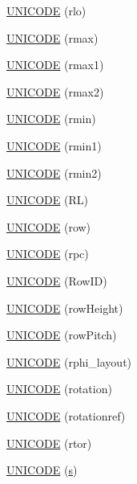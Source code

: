 \begin{DoxyCompactItemize}
\item 
\hyperlink{namespace_d_d4hep_1_1_x_m_l_a0da0949201069230cc25bbe49679731f}{U\+N\+I\+C\+O\+DE} (rlo)
\item 
\hyperlink{namespace_d_d4hep_1_1_x_m_l_ae875b1a18d2f7956471b2d7f80f9b26d}{U\+N\+I\+C\+O\+DE} (rmax)
\item 
\hyperlink{namespace_d_d4hep_1_1_x_m_l_a1e435d895e1b5eab76b63a12415d4813}{U\+N\+I\+C\+O\+DE} (rmax1)
\item 
\hyperlink{namespace_d_d4hep_1_1_x_m_l_a747ae66001d3b1e6c42f5091a2a4e73c}{U\+N\+I\+C\+O\+DE} (rmax2)
\item 
\hyperlink{namespace_d_d4hep_1_1_x_m_l_ab5bfaefe5696b158b3d227c3797bbfb3}{U\+N\+I\+C\+O\+DE} (rmin)
\item 
\hyperlink{namespace_d_d4hep_1_1_x_m_l_a903f87e0f9c5a2ebc96a0289b4c917ec}{U\+N\+I\+C\+O\+DE} (rmin1)
\item 
\hyperlink{namespace_d_d4hep_1_1_x_m_l_a4e1b69cc598ccf7abcc8d544429c88d3}{U\+N\+I\+C\+O\+DE} (rmin2)
\item 
\hyperlink{namespace_d_d4hep_1_1_x_m_l_a7170517d8656521eef81bed4e7179632}{U\+N\+I\+C\+O\+DE} (RL)
\item 
\hyperlink{namespace_d_d4hep_1_1_x_m_l_aec4e3ad06e56bb18cb9ad2e67484d903}{U\+N\+I\+C\+O\+DE} (row)
\item 
\hyperlink{namespace_d_d4hep_1_1_x_m_l_a0f7e9a352ef00d699f4c80a5c839daaa}{U\+N\+I\+C\+O\+DE} (rpc)
\item 
\hyperlink{namespace_d_d4hep_1_1_x_m_l_a5bdac2ce9acc58f9e886b90ec6cea5bd}{U\+N\+I\+C\+O\+DE} (Row\+ID)
\item 
\hyperlink{namespace_d_d4hep_1_1_x_m_l_a48a412668853f7fff376ebbaa5f98ba3}{U\+N\+I\+C\+O\+DE} (row\+Height)
\item 
\hyperlink{namespace_d_d4hep_1_1_x_m_l_a6f7d61e331d2c5b4f80950285dee03ad}{U\+N\+I\+C\+O\+DE} (row\+Pitch)
\item 
\hyperlink{namespace_d_d4hep_1_1_x_m_l_a9066e0dca5ccaa03b7e57e5eb1998f44}{U\+N\+I\+C\+O\+DE} (rphi\+\_\+layout)
\item 
\hyperlink{namespace_d_d4hep_1_1_x_m_l_a09a55b975545f86f8183aeff445d3d8c}{U\+N\+I\+C\+O\+DE} (rotation)
\item 
\hyperlink{namespace_d_d4hep_1_1_x_m_l_a057bf2de9416efe8d5153085fa33cd0b}{U\+N\+I\+C\+O\+DE} (rotationref)
\item 
\hyperlink{namespace_d_d4hep_1_1_x_m_l_a7fa90170666ca58dd54b29475b2df47f}{U\+N\+I\+C\+O\+DE} (rtor)
\item 
\hyperlink{namespace_d_d4hep_1_1_x_m_l_a41b5e423b23bee82d221f775c71df1fa}{U\+N\+I\+C\+O\+DE} (\hyperlink{_volumes_8cpp_a17ca6bfc8040d695d3cada22a4763d40}{s})

\end{DoxyCompactItemize}
